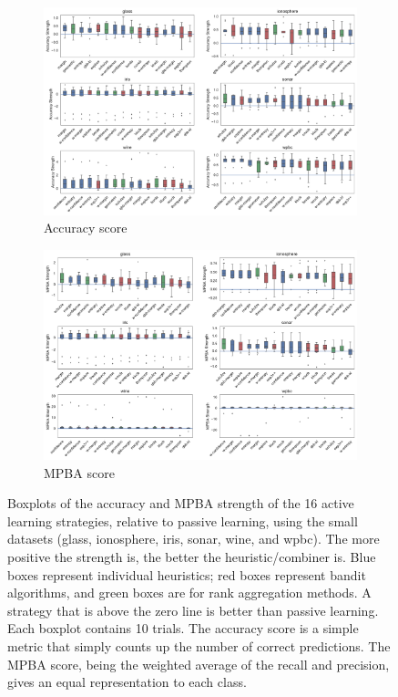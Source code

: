 \documentclass[fleqn,10pt,lineno]{wlpeerj} %
\begin{document}
\begin{figure}[tbp]
	\centering
	\begin{subfigure}[t]{\textwidth}
        \centering
        \includegraphics[width=\textwidth]{figures/strengths-accuracy-small}
		\caption{Accuracy score}
		\label{fig:strengths-accuracy-small}
	\end{subfigure}
	\begin{subfigure}[t]{\textwidth}
        \centering
        \includegraphics[width=\textwidth]{figures/strengths-mpba-small}
		\caption{MPBA score}
		\label{fig:strengths-accuracy-large}
    \end{subfigure}
	\caption[Policy strength]{Boxplots of the accuracy and MPBA strength of the
	16 active learning strategies, relative to passive learning, using the
	small datasets (glass, ionosphere, iris, sonar, wine, and wpbc). The more
	positive the strength is, the better the heuristic/combiner is. Blue boxes
	represent individual heuristics; red boxes represent bandit algorithms, and
	green boxes are for rank aggregation methods. A strategy that is above the
	zero line is better than passive learning. Each boxplot contains 10 trials.
	The accuracy score is a simple metric that simply counts up the number of
	correct predictions. The MPBA score, being the weighted average of the
	recall and precision, gives an equal representation to each class.}
	\label{fig:strengths-small}
\end{figure}
\end{document}
